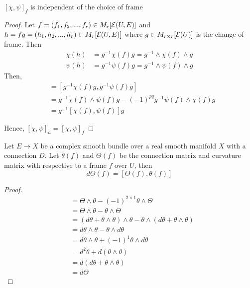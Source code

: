 \begin{proposition}
	$[\chi, \psi]_f$ is independent of the choice of frame
	\begin{proof}
		Let $f = (f_1, f_2, ..., f_r) \in M_r[\mathcal{E}(U, E)]$ and  $h = fg = (h_1, h_2, ..., h_r) \in M_r[\mathcal{E}(U, E)]$ where $g \in M_{r \times r}[\mathcal{E}(U)]$ is the change of frame. Then
		\begin{align*}
			\chi(h) &= g^{-1} \chi(f) g = g^{-1} \wedge \chi(f) \wedge g \\
			\psi(h) &= g^{-1} \psi(f) g = g^{-1} \wedge \psi(f) \wedge g
		\end{align*}
		Then,
		\begin{align*}
			[\chi(h), \psi(h)]
			&= [g^{-1} \chi(f) g, g^{-1} \psi(f) g] \\
			&= g^{-1} \chi(f) \wedge  \psi(f) g - (-1)^{pq} g^{-1} \psi(f)  \wedge \chi(f) g \\
			&= g^{-1} [\chi(f), \psi(f)] g
		\end{align*}
		
		Hence, $[\chi, \psi]_h = [\chi, \psi]_f$
	\end{proof}
\end{proposition}

\begin{proposition}
	Let $E \to X$ be a complex smooth bundle over a real smooth manifold $X$ with a connection $D$. Let $\theta(f)$ and $\Theta(f)$ be the connection matrix and curvature matrix with respective to a frame $f$ over $U$, then
	$$
		d \Theta(f) = [\Theta(f), \theta(f)]
	$$
	
	\begin{proof}
		\begin{align*}
			[\Theta, \theta]
			&= \Theta \wedge \theta - (-1)^{2 \times 1} \theta \wedge \Theta \\
			&=  \Theta \wedge \theta - \theta \wedge \Theta \\
			&=  (d\theta + \theta \wedge \theta) \wedge \theta - \theta \wedge (d\theta + \theta \wedge \theta) \\
			&= d\theta \wedge \theta - \theta \wedge d\theta \\
			&= d\theta \wedge \theta + (-1)^1 \theta \wedge d\theta \\
			&= d^2 \theta + d (\theta \wedge \theta) \\
			&= d (d\theta + \theta \wedge \theta) \\
			&= d \Theta
		\end{align*}
	\end{proof}
\end{proposition}

